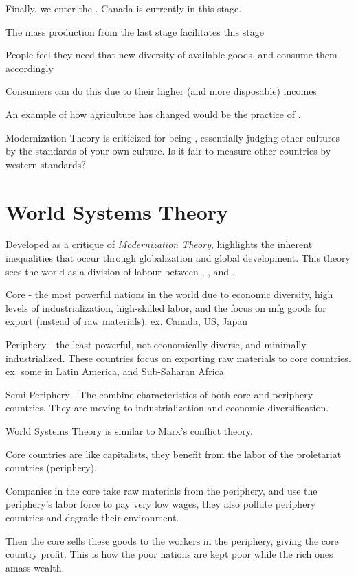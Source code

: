 Finally, we enter the . Canada is currently in this stage.
\begin{bullets}
	\item The mass production from the last stage facilitates this stage
	\item People feel they need that new diversity of available goods, and consume them accordingly
	\item Consumers can do this due to their higher (and more disposable) incomes
\end{bullets}

An example of how agriculture has changed would be the practice of .

Modernization Theory is criticized for being , essentially judging other cultures by the standards of your own culture. Is it fair to measure other countries by western standards?

\section{World Systems Theory}

Developed as a critique of \textit{Modernization Theory},  highlights the inherent inequalities that occur through globalization and global development. This theory sees the world as a division of labour between , , and .
\begin{bullets}
	\item Core - the most powerful nations in the world due to economic diversity, high levels of industrialization, high-skilled labor, and the focus on mfg goods for export (instead of raw materials). ex. Canada, US, Japan
	\item Periphery - the least powerful, not economically diverse, and minimally industrialized. These countries focus on exporting raw materials to core countries. ex. some in Latin America, and Sub-Saharan Africa
	\item Semi-Periphery - The combine characteristics of both core and periphery countries. They are moving to industrialization and economic diversification.
\end{bullets}

World Systems Theory is similar to Marx's conflict theory.
\begin{bullets}
	\item Core countries are like capitalists, they benefit from the labor of the proletariat countries (periphery).
	\item Companies in the core take raw materials from the periphery, and use the periphery's labor force to pay very low wages, they also pollute periphery countries and degrade their environment.
	\item Then the core sells these goods to the workers in the periphery, giving the core country profit. This is how the poor nations are kept poor while the rich ones amass wealth.
\end{bullets}


